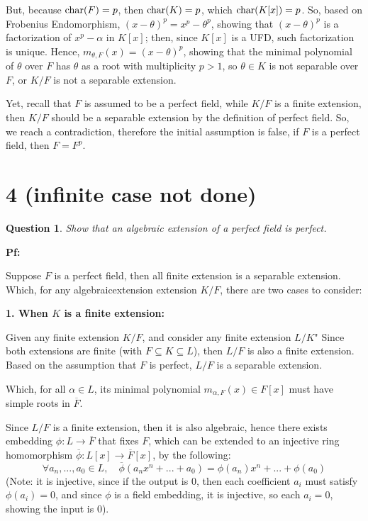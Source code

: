 \documentclass{article}
\newtheorem{question}{Question}
\begin{document}
But, because $\textmd{char}(F)=p$, then $\textmd{char}(K)=p$, which $\textmd{char}(K[x])=p$. So, based on Frobenius Endomorphism, $(x-\theta)^p = x^p-\theta^p$, showing that $(x-\theta)^p$ is a factorization of $x^p-\alpha$ in $K[x]$; then, since $K[x]$ is a UFD, such factorization is unique. Hence, $m_{\theta,F}(x) = (x-\theta)^p$, showing that the minimal polynomial of $\theta$ over $F$ has $\theta$ as a root with multiplicity $p>1$, so $\theta\in K$ is not separable over $F$, or $K/F$ is not a separable extension.

Yet, recall that $F$ is assumed to be a perfect field, while $K/F$ is a finite extension, then $K/F$ should be a separable extension by the definition of perfect field. So, we reach a contradiction, therefore the initial assumption is false, if $F$ is a perfect field, then $F=F^p$.

\break

\section*{4 (infinite case not done)}
\begin{myBox}[]{}
    \begin{question}
        Show that an algebraic extension of a perfect field is perfect.
    \end{question}
\end{myBox}

\textbf{Pf:}

Suppose $F$ is a perfect field, then all finite extension is a separable extension. Which, for any algebraicextension extension $K/F$, there are two cases to consider:

\hfil

\textbf{1. When $K$ is a finite extension:}

Given any finite extension $K/F$, and consider any finite extension $L/K$" Since both extensions are finite (with $F\subseteq K\subseteq L$), then $L/F$ is also a finite extension. Based on the assumption that $F$ is perfect, $L/F$ is a separable extension.

Which, for all $\alpha\in L$, its minimal polynomial $m_{\alpha,F}(x)\in F[x]$ must have simple roots in $\overline{F}$.

\hfil

Since $L/F$ is a finite extension, then it is also algebraic, hence there exists embedding $\phi:L\rightarrow\overline{F}$ that fixes $F$, which can be extended to an injective ring homomorphism $\overline{\phi}:L[x]\rightarrow\overline{F}[x]$, by the following:
$$\forall a_n,...,a_0\in L,\quad \overline{\phi}(a_nx^n+...+a_0)=\phi(a_n)x^n+...+\phi(a_0)$$
(Note: it is injective, since if the output is $0$, then each coefficient $a_i$ must satisfy $\phi(a_i)=0$, and since $\phi$ is a field embedding, it is injective, so each $a_i=0$, showing the input is $0$).
\end{document}
